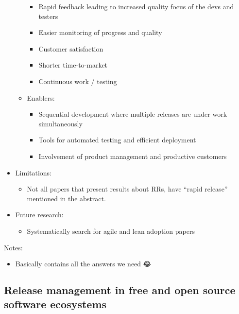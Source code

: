 \documentclass[]{book}
\providecommand{\tightlist}{%
  \setlength{\itemsep}{0pt}\setlength{\parskip}{0pt}}
\begin{document}
\begin{itemize}
\begin{itemize}
    \begin{itemize}
    \tightlist
    \item
      Rapid feedback leading to increased quality focus of the devs and
      testers
    \item
      Easier monitoring of progress and quality
    \item
      Customer satisfaction
    \item
      Shorter time-to-market
    \item
      Continuous work / testing
    \end{itemize}
  \item
    Enablers:

    \begin{itemize}
    \tightlist
    \item
      Sequential development where multiple releases are under work
      simultaneously
    \item
      Tools for automated testing and efficient deployment
    \item
      Involvement of product management and productive customers
    \end{itemize}
  \end{itemize}
\item
  Limitations:

  \begin{itemize}
  \tightlist
  \item
    Not all papers that present results about RRs, have ``rapid
    release'' mentioned in the abstract.
  \end{itemize}
\item
  Future research:

  \begin{itemize}
  \tightlist
  \item
    Systematically search for agile and lean adoption papers
  \end{itemize}
\end{itemize}

Notes:

\begin{itemize}
\tightlist
\item
  Basically contains all the answers we need 😂
\end{itemize}

\subsection{Release management in free and open source software
ecosystems}\label{release-management-in-free-and-open-source-software-ecosystems}
\end{document}
